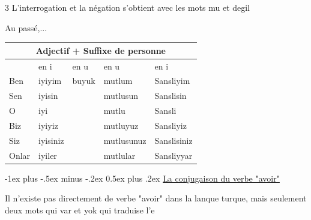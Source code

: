 \documentclass[10pt,landscape,letterpaper]{article}
\makeatletter
\renewcommand{\section}{\@startsection{section}{1}{0mm}%
                                {-1ex plus -.5ex minus -.2ex}%
                                {0.5ex plus .2ex}%
                                {\sffamily\large}}
\makeatother
\begin{document}
\begin{multicols}{3}
L'interrogation et la négation s'obtient avec les mots mu et degil




Au passé,...


\begin{tabular}{|lllll|}
\hline
\multicolumn{5}{|c|}{Adjectif + Suffixe de personne} \\ \hline
\rowcolor[HTML]{C0C0C0} 
\multicolumn{1}{|l|}{\cellcolor[HTML]{C0C0C0}} &
  \multicolumn{1}{l|}{\cellcolor[HTML]{C0C0C0}en i} &
  \multicolumn{1}{l|}{\cellcolor[HTML]{C0C0C0}en u} &
  \multicolumn{1}{l|}{\cellcolor[HTML]{C0C0C0}en u} &
  en i \\ \hline
\multicolumn{1}{|l|}{Ben} &
  \multicolumn{1}{l|}{iyiyim} &
  \multicolumn{1}{l|}{buyuk} &
  \multicolumn{1}{l|}{mutlum} &
  Sansliyim \\ \hline
\multicolumn{1}{|l|}{Sen} &
  \multicolumn{1}{l|}{\cellcolor[HTML]{EFEFEF}iyisin} &
  \multicolumn{1}{l|}{\cellcolor[HTML]{EFEFEF}} &
  \multicolumn{1}{l|}{\cellcolor[HTML]{EFEFEF}mutlusun} &
  \cellcolor[HTML]{EFEFEF}Sanslisin \\ \hline
\multicolumn{1}{|l|}{O} &
  \multicolumn{1}{l|}{iyi} &
  \multicolumn{1}{l|}{} &
  \multicolumn{1}{l|}{mutlu} &
  Sansli \\ \hline
\multicolumn{1}{|l|}{Biz} &
  \multicolumn{1}{l|}{\cellcolor[HTML]{EFEFEF}iyiyiz} &
  \multicolumn{1}{l|}{\cellcolor[HTML]{EFEFEF}} &
  \multicolumn{1}{l|}{\cellcolor[HTML]{EFEFEF}mutluyuz} &
  \cellcolor[HTML]{EFEFEF}Sansliyiz \\ \hline
\multicolumn{1}{|l|}{Siz} &
  \multicolumn{1}{l|}{iyisiniz} &
  \multicolumn{1}{l|}{} &
  \multicolumn{1}{l|}{mutlusunuz} &
  Sanslisiniz \\ \hline
\multicolumn{1}{|l|}{Onlar} &
  \multicolumn{1}{l|}{\cellcolor[HTML]{EFEFEF}iyiler} &
  \multicolumn{1}{l|}{\cellcolor[HTML]{EFEFEF}} &
  \multicolumn{1}{l|}{\cellcolor[HTML]{EFEFEF}mutlular} &
  \cellcolor[HTML]{EFEFEF}Sansliyyar \\ \hline
\end{tabular}





\section{\underline{La conjugaison du verbe "avoir"}}

Il n'existe pas directement de verbe "avoir" dans la lanque turque,  mais seulement deux mots qui var et yok qui traduise l'e


\end{multicols}
\end{document}
